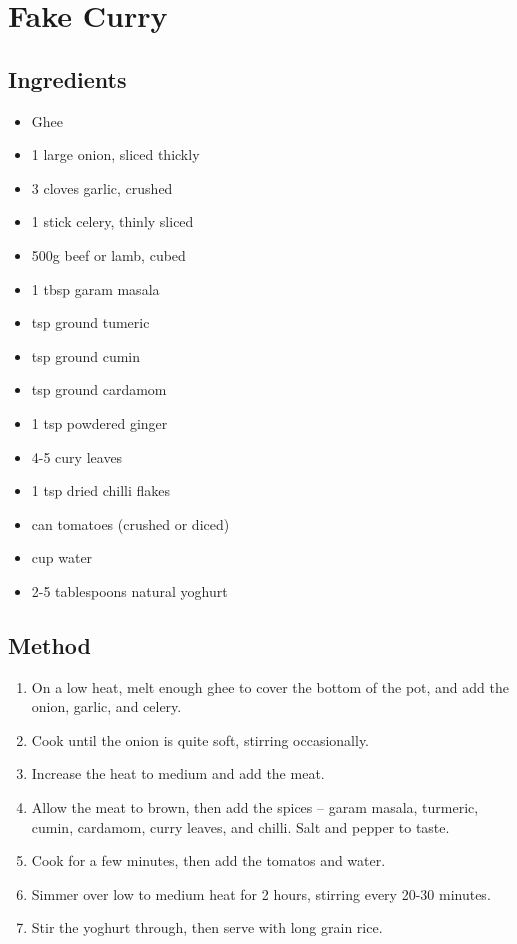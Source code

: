 \section{Fake Curry}
  \begin{multicols}{2}
    \subsection{Ingredients}
      \begin{itemize}
        \item Ghee
        \item 1 large onion, sliced thickly
        \item 3 cloves garlic, crushed
        \item 1 stick celery, thinly sliced
        \item 500g beef or lamb, cubed
        \item 1 tbsp garam masala
        \item {} tsp ground tumeric
        \item {} tsp ground cumin
        \item {} tsp ground cardamom
        \item 1 tsp powdered ginger
        \item 4-5 cury leaves
        \item 1 tsp dried chilli flakes
        \item {} can tomatoes (crushed or diced)
        \item {} cup water
        \item 2-5 tablespoons natural yoghurt
      \end{itemize}
  \vfill\null
  \columnbreak
  \subsection{Method}
    \begin{enumerate}
      \item On a low heat, melt enough ghee to cover the bottom of the pot, and add the onion, garlic, and celery.
      \item Cook until the onion is quite soft, stirring occasionally.
      \item Increase the heat to medium and add the meat.
      \item Allow the meat to brown, then add the spices -- garam masala, turmeric, cumin, cardamom, curry leaves, and chilli. Salt and pepper to taste.
      \item Cook for a few minutes, then add the tomatos and water.
      \item Simmer over low to medium heat for 2 hours, stirring every 20-30 minutes.
      \item Stir the yoghurt through, then serve with long grain rice.
    \end{enumerate}
  \end{multicols}
